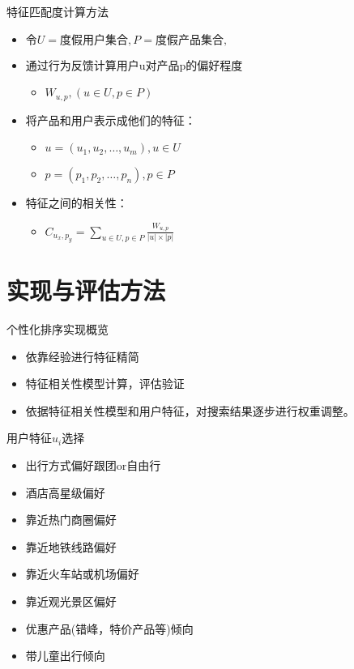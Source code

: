 \documentclass{beamer}
\begin{document}
\begin{CJK}{UTF8}{gbsn}
\begin{frame}{特征匹配度计算方法}
  \begin{itemize}
    \item { $ \text{令}U=\text{度假用户集合}, P=\text{度假产品集合}, $ }
    \item {
      通过行为反馈计算用户u对产品p的偏好程度
      \begin{itemize}
        \item {
          $ W_{u,p}, (u \in U, p \in P) $
        }
      \end{itemize}
    }
    \item {
      将产品和用户表示成他们的特征：
      \begin{itemize}
      \item { $ u=(u_1, u_2, \dots , u_m), u \in U $ }
      \item { $ p=(p_1, p_2, \dots , p_n), p \in P $ }
      \end{itemize}
    }
    \item {
      特征之间的相关性：
      \begin{itemize}
        \item { $ C_{u_x,p_y} = \sum_{u \in U, p \in P}{\frac{W_{u,p}}{|u| \times |p|}}$ }
      \end{itemize}
    } 
    
  \end{itemize}
\end{frame}



\section{实现与评估方法}

\begin{frame}{个性化排序实现概览}
  \begin{itemize}
  \item {依靠经验进行特征精简}
  \item {特征相关性模型计算，评估验证}
  \item {依据特征相关性模型和用户特征，对搜索结果逐步进行权重调整。}
  \end{itemize}
\end{frame}

\begin{frame}{用户特征$u_i$选择}
  \begin{itemize}
  \item { 出行方式偏好跟团or自由行 }
  \item { 酒店高星级偏好 }
  \item { 靠近热门商圈偏好 }
  \item { 靠近地铁线路偏好 }
  \item { 靠近火车站或机场偏好 }
  \item { 靠近观光景区偏好 }
  \item { 优惠产品(错峰，特价产品等)倾向 }
  \item { 带儿童出行倾向 }
  \end{itemize}
\end{frame}


\end{CJK}
\end{document}

